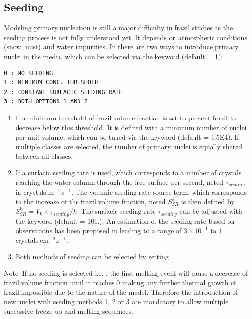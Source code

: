 \subsection{Seeding}
\label{section:seeding}

Modeling primary nucleation is still a major difficulty in frazil studies as the seeding process is
not fully understood yet. It depends on atmospheric conditions (snow, mist) and water impurities.
In \khione there are two ways to introduce primary nuclei in the media, which can be selected via the keyword
 (default = 1):
\begin{lstlisting}
0 : NO SEEDING
1 : MINIMUM CONC. THRESHOLD
2 : CONSTANT SURFACIC SEEDING RATE
3 : BOTH OPTIONS 1 AND 2
\end{lstlisting}

\begin{enumerate}
\item If  a minimum threshold of frazil volume fraction
is set to prevent frazil to decrease below this threshold. It is defined with a
minimum number of nuclei per unit volume, which can be tuned via the keyword
 (default = 1.5E4). If multiple classes are selected,
the number of primary nuclei is equally shared between all classes.

\item If  a surfacic seeding rate is used, which corresponds
to a number of crystals reaching the water column through the free surface per second, noted $\tau_{seeding}$ in crystals.m$^{-2}$.s$^{-1}$.
The volumic seeding rate source term, which corresponds to the increase of the frazil volume fraction, noted $S^k_{SR}$ is then defined by $S^k_{SR} = V_k \times \tau_{seeding} /h$.
The surfacic seeding rate $\tau_{seeding}$ can be adjusted with the keyword
 (default = 100.). An estimation of the seeding rate based on observations has been proposed in \cite{daly_1994} leading to a range of $3 \times 10^{-1}$ to $1$ crystals.cm$^{-2}$.s$^{-1}$.

\item Both methods of seeding can be selected by setting .
\end{enumerate}

\begin{WarningBlock}{Note:}
    If no seeding is selected i.e. ,
    the first melting event will cause a decrease of frazil volume fraction
    until it reaches $0$ making any further thermal growth of frazil impossible
    due to the nature of the model.
    Therefore the introduction of new nuclei with seeding methods 1, 2 or 3 are mandatory
    to allow multiple successive freeze-up and melting sequences.
\end{WarningBlock}

